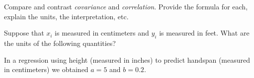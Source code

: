 \documentclass[addpoints,12pt]{exam}
\begin{document}
\begin{questions}
\question Compare and contrast \emph{covariance} and \emph{correlation}. Provide the formula for each, explain the units, the interpretation, etc.

\question Suppose that $x_i$ is measured in centimeters and $y_i$ is measured in feet. What are the units of the following quantities? 


\question In a regression using height (measured in inches) to predict handspan (measured in centimeters) we obtained $a = 5$ and $b = 0.2$. 
\end{questions}
\end{document}
